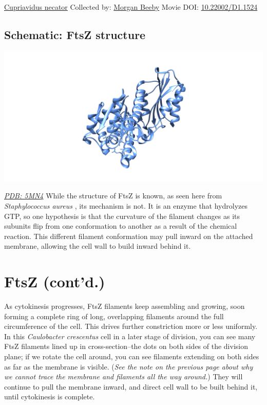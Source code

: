 \documentclass[]{tufte-book}
\begin{document}
\label{fig:5-9a}\protect\hyperlink{tree}{Cupriavidus necator} Collected by: \protect\hyperlink{morgan_beeby}{Morgan Beeby} Movie DOI: \href{https://doi.org/10.22002/D1.1524}{10.22002/D1.1524}

\hypertarget{FtsZ_structure}{%
\subsection*{Schematic: FtsZ structure}\label{FtsZ_structure}}

\includegraphics{img/schematics/5_9_1}

\href{http://rcsb.org/structure/5MN4}{\emph{PDB: 5MN4}}
While the structure of FtsZ is known, as seen here from \emph{Staphylococcus aureus} \citep{wagstaff2017}, its mechanism is not. It is an enzyme that hydrolyzes GTP, so one hypothesis is that the curvature of the filament changes as its subunits flip from one conformation to another as a result of the chemical reaction. This different filament conformation may pull inward on the attached membrane, allowing the cell wall to build inward behind it.

\hypertarget{ftsz-contd.}{%
\section{FtsZ (cont'd.)}\label{ftsz-contd.}}

As cytokinesis progresses, FtsZ filaments keep assembling and growing, soon forming a complete ring of long, overlapping filaments around the full circumference of the cell. This drives further constriction more or less uniformly. In this \emph{Caulobacter crescentus} cell in a later stage of division, you can see many FtsZ filaments lined up in cross-section--the dots on both sides of the division plane; if we rotate the cell around, you can see filaments extending on both sides as far as the membrane is visible. (\emph{See the note on the previous page about why we cannot trace the membrane and filaments all the way around.}) They will continue to pull the membrane inward, and direct cell wall to be built behind it, until cytokinesis is complete.
\end{document}
